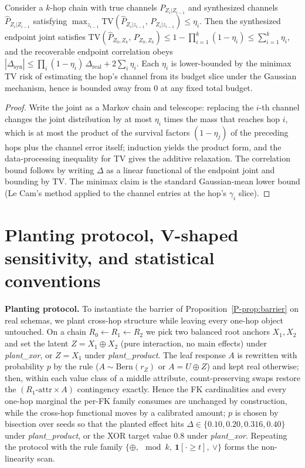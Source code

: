 \documentclass[sigconf, nonacm]{acmart}
\newcommand{\pref}[1]{\ref{P-#1}}
\begin{document}
\begin{lemma}
\label{lem:tvdecay}
Consider a $k$-hop chain with true channels $P_{Z_i|Z_{i-1}}$ and
synthesized channels $\hat P_{Z_i|Z_{i-1}}$ satisfying
$\max_{z_{i-1}}\mathrm{TV}(\hat P_{Z_i|z_{i-1}},\,P_{Z_i|z_{i-1}})
\le\eta_i$. Then the synthesized endpoint joint satisfies
$\mathrm{TV}(\hat P_{Z_0,Z_k},\,P_{Z_0,Z_k})
\le 1-\prod_{i=1}^k(1-\eta_i)\le\sum_{i=1}^k\eta_i$, and the recoverable
endpoint correlation obeys
$|\Delta_{\mathrm{syn}}|\le\prod_i(1-\eta_i)\,\Delta_{\mathrm{real}}
+2\sum_i\eta_i$. Each $\eta_i$ is lower-bounded by the minimax TV risk of
estimating the hop's channel from its budget slice under the Gaussian
mechanism, hence is bounded away from $0$ at any fixed total budget.
\end{lemma}
\begin{proof}
Write the joint as a Markov chain and telescope: replacing the $i$-th
channel changes the joint distribution by at most $\eta_i$ times the mass
that reaches hop $i$, which is at most the product of the survival
factors $(1-\eta_j)$ of the preceding hops plus the channel error itself;
induction yields the product form, and the data-processing inequality for
TV gives the additive relaxation. The correlation bound follows by
writing $\Delta$ as a linear functional of the endpoint joint and
bounding by TV. The minimax claim is the standard Gaussian-mean lower
bound (Le Cam's method applied to the channel entries at the hop's
$\gamma_i$ slice).
\end{proof}

\section{Planting protocol, V-shaped sensitivity, and statistical conventions}
\label{app:plant}

\textbf{Planting protocol.} To instantiate the barrier of
Proposition~\pref{prop:barrier} on real schemas, we plant cross-hop
structure while leaving every one-hop object untouched. On a chain
$R_0{\leftarrow}R_1{\leftarrow}R_2$ we pick two balanced root anchors
$X_1,X_2$ and set the latent $Z=X_1\oplus X_2$ (pure interaction, no main
effects) under \emph{plant\_xor}, or $Z=X_1$ under \emph{plant\_product}.
The leaf response $A$ is rewritten
with probability $p$ by the rule ($A\sim\mathrm{Bern}(r_Z)$ or
$A=U\oplus Z$) and kept real otherwise; then, within each value class of
a middle attribute, count-preserving swaps restore the
$(R_1\text{-attr}\times A)$ contingency exactly. Hence the FK
cardinalities and every one-hop marginal the per-FK family consumes are
unchanged by construction, while the cross-hop functional moves by a
calibrated amount; $p$ is chosen by bisection over seeds so that the
planted effect hits $\Delta\in\{0.10,0.20,0.316,0.40\}$ under
\emph{plant\_product}, or the XOR target value $0.8$ under
\emph{plant\_xor}. Repeating the protocol with the rule family
$\{\oplus,\ \bmod k,\ \mathbf 1[\cdot\ge t],\ \vee\}$ forms the
non-linearity scan.
\end{document}
